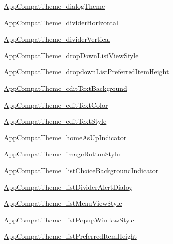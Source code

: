 \begin{Desc}
\hyperlink{classandroid_1_1support_1_1v4_1_1_r_1_1styleable_7b06171d505e781dc07ea55c3ea49e83}{AppCompatTheme\_\-dialogTheme} 

\hyperlink{classandroid_1_1support_1_1v4_1_1_r_1_1styleable_e74ae6f850a84137337f5a8fc61e97a0}{AppCompatTheme\_\-dividerHorizontal} 

\hyperlink{classandroid_1_1support_1_1v4_1_1_r_1_1styleable_2cbf4f6a6038a3c0ee43fa2d8baf13be}{AppCompatTheme\_\-dividerVertical} 

\hyperlink{classandroid_1_1support_1_1v4_1_1_r_1_1styleable_7f77b4643b5ac4aa9e62aa4fc9232548}{AppCompatTheme\_\-dropDownListViewStyle} 

\hyperlink{classandroid_1_1support_1_1v4_1_1_r_1_1styleable_a0ae883a1cfc49924dd71cb9014f35b6}{AppCompatTheme\_\-dropdownListPreferredItemHeight} 

\hyperlink{classandroid_1_1support_1_1v4_1_1_r_1_1styleable_1e59b88c396599d1ced4caa57c2a7264}{AppCompatTheme\_\-editTextBackground} 

\hyperlink{classandroid_1_1support_1_1v4_1_1_r_1_1styleable_11e77e8da745db12ac42b8308e77940e}{AppCompatTheme\_\-editTextColor} 

\hyperlink{classandroid_1_1support_1_1v4_1_1_r_1_1styleable_be5ae2f20868c09eec22ffbecbfd4bd3}{AppCompatTheme\_\-editTextStyle} 

\hyperlink{classandroid_1_1support_1_1v4_1_1_r_1_1styleable_760d4c63c4342ad1814a4021ddbaf121}{AppCompatTheme\_\-homeAsUpIndicator} 

\hyperlink{classandroid_1_1support_1_1v4_1_1_r_1_1styleable_55a07b8f677eb6c8883891c1f2cfcf74}{AppCompatTheme\_\-imageButtonStyle} 

\hyperlink{classandroid_1_1support_1_1v4_1_1_r_1_1styleable_04b55514ebd83ea5a03fba7aec47f213}{AppCompatTheme\_\-listChoiceBackgroundIndicator} 

\hyperlink{classandroid_1_1support_1_1v4_1_1_r_1_1styleable_76eadcfe0bf32602bc65706cb1655757}{AppCompatTheme\_\-listDividerAlertDialog} 

\hyperlink{classandroid_1_1support_1_1v4_1_1_r_1_1styleable_1b00f2d6ba69378b7ec0cfccf25c0f46}{AppCompatTheme\_\-listMenuViewStyle} 

\hyperlink{classandroid_1_1support_1_1v4_1_1_r_1_1styleable_bd2ee13ff17345e9f5fe98bc84202b71}{AppCompatTheme\_\-listPopupWindowStyle} 

\hyperlink{classandroid_1_1support_1_1v4_1_1_r_1_1styleable_54d99bb5430cafe306a647e9b8c23557}{AppCompatTheme\_\-listPreferredItemHeight} 


\end{Desc}
